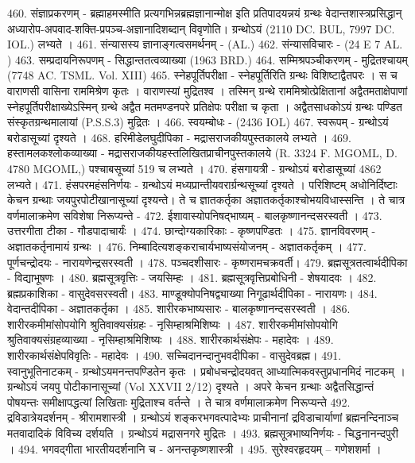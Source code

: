 460. संज्ञाप्रकरणम् - ब्रह्माहमस्मीति प्रत्यगभिन्नब्रह्मज्ञानान्मोक्ष इति प्रतिपादयन्नयं ग्रन्थः वेदान्तशास्त्रप्रसिद्धान् अध्यारोप-अपवाद-शक्ति-प्रपञ्च-अज्ञानादिशब्दान् विवृणोति। ग्रन्थोऽयं (2110 DC. BUL,  7997 DC. IOL.) लभ्यते । 
461. संन्यासस्य ज्ञानाङ्गत्वसमर्थनम् - (AL.)
462. संन्यासविचारः - (24 E 7 AL. )
463. सम्प्रदायनिरूपणम् - सिद्धान्ततत्वव्याख्या (1963 BRD.)
464. सम्मिश्रपञ्चीकरणम् - मुद्रितश्चायम् (7748 AC. TSML. Vol. XIII) 
465. स्नेहपूर्तिपरीक्षा - स्नेहपूर्तिरिति ग्रन्थः विशिष्टाद्वैतपरः । स च वाराणसी वासिना राममिश्रेण कृतः । वाराणस्यां मुद्रितश्व । तस्मिन् ग्रन्थे राममिश्रोत्प्रेक्षितानां अद्वैतमताक्षेपाणां स्नेहपूर्तिपरीक्षाख्येऽस्मिन् ग्रन्थे अद्वैत मतमण्डनपरे प्रतिक्षेपः परीक्षा च कृता । अद्वैतसाधकोऽयं ग्रन्थः पण्डित संस्कृतग्रन्थमालायां (P.S.S.3) मुद्रितः । 
466. स्वयम्बोधः - (2436 IOL)
467. स्वरूपम् - ग्रन्थोऽयं बरोडासूच्यां दृश्यते । 
468. हरिमीडेलघुदीपिका - मद्रासराजकीयपुस्तकालये लभ्यते । 
469. हस्तामलकश्लोकव्याख्या - मद्रासराजकीयहस्तलिखितप्राचीनपुस्तकालये (R. 3324 F. MGOML, D. 4780 MGOML,) पश्चाबसूच्यां 519 च लभ्यते । 
470. हंसगायत्री -  ग्रन्थोऽयं बरोडासूच्यां 	4862 लभ्यते। 
471. हंसपरमहंसनिर्णयः - ग्रन्थोऽयं मध्यप्रान्तीयवरार्ग्रन्थसूच्यां दृश्यते । 
परिशिष्टम् 
	अधोनिर्दिष्टाः केचन ग्रन्थाः जयपुरपोटीखानासूच्यां दृश्यन्ते। ते च ज्ञातकर्तृका अज्ञातकर्तृकाश्चोभयविधास्सन्ति । ते चात्र वर्णमालाक्रमेण सविशेषा निरूप्यन्ते - 
472. ईशावास्योपनिषद्भाष्यम् - बालकृष्णानन्दसरस्वती । 
473. उत्तरगीता टीका - गौडपादाचार्यंः ।
474. छान्दोग्यकारिकाः - कृष्णपण्डितः । 
475. ज्ञानविवरणम् - अज्ञातकर्तृनामायं ग्रन्थः । 
476. निम्बादित्यशङ्कराचार्यभाष्यसंयोजनम् - अज्ञातकर्तृकम् । 
477. पूर्णचन्द्रोदयः - नारायणेन्द्रसरस्वती । 
478. पञ्चदशीसारः - कृष्णरामचक्रवर्ती। 
479. ब्रह्मसूत्रतत्वार्थदीपिका - विद्याभूषणः । 
480. ब्रह्मसूत्रवृत्तिः - जयसिम्हः । 
481. ब्रह्मसूत्रवृत्तिप्रबोधिनी - शेषयादवः । 
482. ब्रह्मप्रकाशिका - वासुदेवसरस्वती। 
483. माण्डूक्योपनिषद्व्याख्या निगूढार्थदीपिका - नारायणः।
484. वेदान्तदीपिका - अज्ञातकर्तृका । 
485. शारीरकभाष्यसारः - बालकृष्णानन्दसरस्वती ।
486. शारीरकमीमांसोपयोगि श्रुतिवाक्यसंग्रहः - नृसिम्हाश्रमिशिष्यः । 
487. शारीरकमीमांसोपयोगि श्रुतिवाक्यसंग्रहव्याख्या - नृसिम्हाश्रमिशिष्यः । 
488. शारीरकार्थसंक्षेपः - महादेवः । 
489. शारीरकार्थसंक्षेपविवृतिः - महादेवः ।
490. सच्चिदानन्दानुभवदीपिका - वासुदेवब्रह्म। 
491. स्वानुभूतिनाटकम् - ग्रन्थोऽयमनन्तपण्डितेन कृतः । प्रबोधचन्द्रोदयवत् आध्यात्मिकवस्तुप्रधानमिदं नाटकम् । ग्रन्थोऽयं जयपु पोटीकानासूच्यां (Vol XXVII 2/12) दृश्यते । अपरे केचन ग्रन्थाः अद्वैतसिद्धान्तं पोषयन्तः समीक्षापद्धत्यां लिखिताः मुद्रिताश्च वर्तन्ते । ते चात्र वर्णमालाक्रमेण निरूप्यन्ते
492. द्रविडात्रेयदर्शनम् - श्रीरामशास्त्री । 
	ग्रन्थोऽयं शङ्करभगवत्पादेभ्यः प्राचीनानां द्रविडाचार्याणां ब्रह्मनन्दिनाञ्च मतवादादिकं विविच्य दर्शयति । ग्रन्थोऽयं मद्रासनगरे मुद्रितः । 
493. ब्रह्मसूत्रभाष्यनिर्णयः - चिद्धनानन्दपुरी । 
494. भगवद्गीता भारतीयदर्शनानि च - अनन्तकृष्णशास्त्री । 
495. सुरेश्वरहृदयम् -- गणेशशर्मा । 

